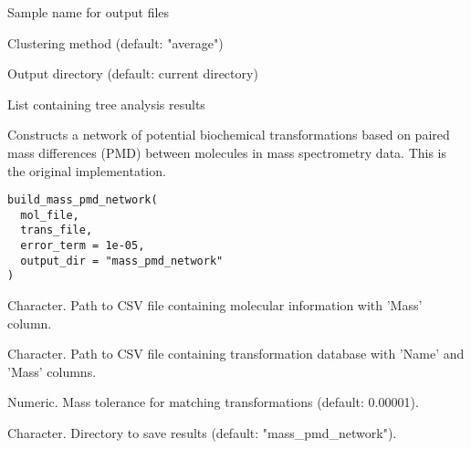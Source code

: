 \documentclass[a4paper]{book}
\begin{document}
%
\begin{Arguments}
\begin{ldescription}
\item[\code{sample\_name}] Sample name for output files

\item[\code{clustering\_method}] Clustering method (default: "average")

\item[\code{output\_dir}] Output directory (default: current directory)
\end{ldescription}
\end{Arguments}
%
\begin{Value}
List containing tree analysis results
\end{Value}
%
\begin{Description}
Constructs a network of potential biochemical transformations based on 
paired mass differences (PMD) between molecules in mass spectrometry data.
This is the original implementation.
\end{Description}
%
\begin{Usage}
\begin{verbatim}
build_mass_pmd_network(
  mol_file,
  trans_file,
  error_term = 1e-05,
  output_dir = "mass_pmd_network"
)
\end{verbatim}
\end{Usage}
%
\begin{Arguments}
\begin{ldescription}
\item[\code{mol\_file}] Character. Path to CSV file containing molecular information with 'Mass' column.

\item[\code{trans\_file}] Character. Path to CSV file containing transformation database with 'Name' and 'Mass' columns.

\item[\code{error\_term}] Numeric. Mass tolerance for matching transformations (default: 0.00001).

\item[\code{output\_dir}] Character. Directory to save results (default: "mass\_pmd\_network").
\end{ldescription}
\end{Arguments}
%
\end{document}
